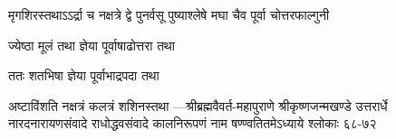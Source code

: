 
{मृगशिरस्तथाऽऽर्द्रा च नक्षत्रे द्वे पुनर्वसू}
{पुष्याश्लेषे मघा चैव पूर्वा चोत्तरफाल्गुनी}

{ज्येष्ठा मूलं तथा ज्ञेया पूर्वाषाढोत्तरा तथा}

{ततः शतभिषा ज्ञेया पूर्वाभाद्रपदा तथा}

{अष्टाविंशति नक्षत्रं कलत्रं शशिनस्तथा}
{\fontsize{10}{4}\selectfont ---श्रीब्रह्मवैवर्त-महापुराणे श्रीकृष्णजन्मखण्डे उत्तरार्धे नारदनारायणसंवादे राधोद्धवसंवादे कालनिरूपणं नाम षण्ण्वतितमेऽध्याये श्लोकाः ६८-७२}


